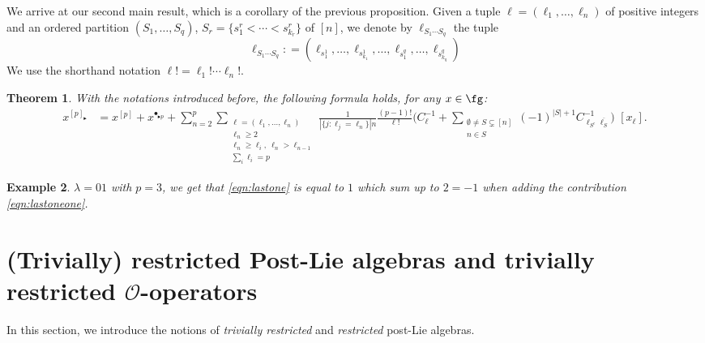 \documentclass[12pt]{article}
\newcommand{\btr}{\blacktriangleright}
\newtheorem{theorem}{Theorem}[subsection]
\newtheorem{example}[theorem]{Example}
\begin{document}
We arrive at our second main result, which is a corollary of the previous proposition. Given a tuple $\ell=(\ell_1,\ldots,\ell_n)$ of positive integers and an ordered partition $(S_1,\ldots,S_q)$, $S_r = \{s^{r}_{1} < \cdots < s^{r}_{k_r}\}$ of $[n]$, we denote by $\ell_{S_1\cdots S_q}$ the tuple
$$
\ell_{S_1\cdots S_q} : = (\ell_{s^1_{1}},\ldots,\ell_{s^1_{k_1}},\ldots,\ell_{s^q_{1}},\ldots,\ell_{s^q_{k_q}})
$$
We use the shorthand notation $\ell ! = \ell_1!\cdots \ell_n!$.
\begin{theorem} With the notations introduced before, the following formula holds, for any $x\in \fg$:
\label{thm:expansion}
\begin{align*}
x^{[p]_{\btr}} &= x^{[p]} + x^{\bullet_{\btr p}}+\sum_{n=2}^{p}\sum_{\substack{\ell=(\ell_1,\ldots,\ell_n) \\ \ell_n \geq 2 \\ \ell_n\geq \ell_i,~ \ell_n > \ell_{n-1} \\ \sum_i \ell_i = p}}\frac{1}{|\{j:\ell_j=\ell_n\}|n}\frac{(p-1)!} {\ell!} \Big(C^{-1}_{\ell} + \sum_{\substack{\emptyset \neq S\subsetneq [n] \\ n \in S }} (-1)^{|S|+1}C^{-1}_{\ell_{S^c}\overline{\ell_{S}}}\Big) \,\, [x_{\ell}]. \nonumber
\end{align*}
\end{theorem}
\begin{example}
$\lambda = 01$ with $p=3$, we get that \eqref{eqn:lastone} is equal to $1$ which sum up to $2=-1$ when adding the contribution \eqref{eqn:lastoneone}.
\end{example}

\section{(Trivially) restricted Post-Lie algebras and trivially restricted $\mathcal{O}$-operators}
In this section, we introduce the notions of \textit{trivially restricted} and \textit{restricted} post-Lie algebras.
\end{document}
